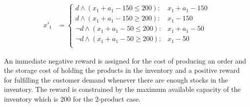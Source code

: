 {\footnotesize
\begin{align*}
x'_1 & = \begin{cases}
d \wedge (x_1 + a_1 - 150 \leq 200) : & x_1 + a_1 - 150 \\
d \wedge (x_1 + a_1 - 150 \geq 200) : & x_1 - 150 \\
\neg d \wedge (x_1 + a_1 - 50 \leq 200): & x_1 + a_1 - 50 \\
\neg d \wedge (x_1 + a_1 - 50 \geq 200): & x_1 - 50 \\
\end{cases}
\end{align*}}

An immediate negative reward is assigned for the cost of producing an order
and the storage cost of holding the products in the inventory and a
positive reward for fulfilling the customer demand whenever there are enough
stocks in the inventory. The reward is constrained by the maximum available capacity of the inventory which is 200 for the 2-product case.
%      			
%
% 
 
